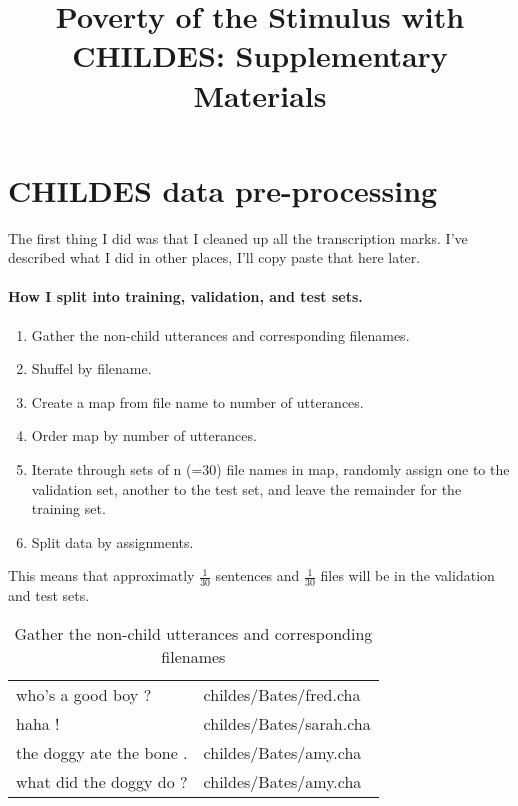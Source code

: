 \documentclass{article}
\title{Poverty of the Stimulus with CHILDES: Supplementary Materials}
\date{}
\begin{document}
\maketitle

\section*{CHILDES data pre-processing}
The first thing I did was that I cleaned up all the transcription marks. I've described what I did in other places, I'll copy paste that here later. 

\paragraph{How I split into training, validation, and test sets.}
\begin{enumerate}
    \item Gather the non-child utterances and corresponding filenames.
    \item Shuffel by filename. 
    \item Create a map from file name to number of utterances.
    \item Order map by number of utterances.
    \item Iterate through sets of n (=30) file names in map, 
        randomly assign one to the validation set, 
        another to the test set, and leave the remainder for the training set. 
    \item Split data by assignments.



\end{enumerate}

This means that approximatly $\frac{1}{30}$ sentences and $\frac{1}{30}$ files will be in the validation and test sets. 

\begin{table}[h!]
\centering
    \caption{Gather the non-child utterances and corresponding filenames}
\begin{tabular}{ll}
\hline
who's a good boy ?       & childes/Bates/fred.cha  \\ 
haha !                   & childes/Bates/sarah.cha \\
the doggy ate the bone . & childes/Bates/amy.cha   \\
what did the doggy do ?  & childes/Bates/amy.cha
\end{tabular}%
\end{table}
\end{document}

